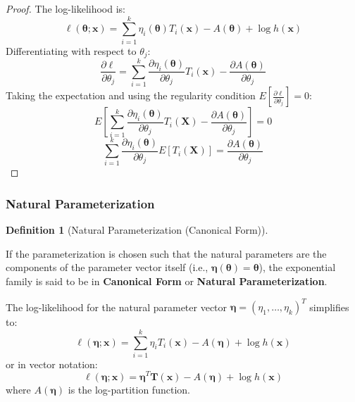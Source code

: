 \documentclass[
  letterpaper,
  DIV=11,
  numbers=noendperiod]{scrreprt}
\renewcommand{\[}{\begin{equation}}
\renewcommand{\]}{\end{equation}}
\theoremstyle{definition}
\newtheorem{definition}{Definition}[chapter]
\theoremstyle{plain}
\theoremstyle{plain}
\theoremstyle{plain}
\theoremstyle{definition}
\theoremstyle{plain}
\theoremstyle{remark}
\begin{document}
\begin{proof}
The log-likelihood is: \[
\ell(\boldsymbol{\theta}; \mathbf{x}) = \sum_{i=1}^k \eta_i(\boldsymbol{\theta}) T_i(\mathbf{x}) - A(\boldsymbol{\theta}) + \log h(\mathbf{x})
\] Differentiating with respect to \(\theta_j\): \[
\frac{\partial \ell}{\partial \theta_j} = \sum_{i=1}^k \frac{\partial \eta_i(\boldsymbol{\theta})}{\partial \theta_j} T_i(\mathbf{x}) - \frac{\partial A(\boldsymbol{\theta})}{\partial \theta_j}
\] Taking the expectation and using the regularity condition
\(E[\frac{\partial \ell}{\partial \theta_j}] = 0\): \[
E\left[ \sum_{i=1}^k \frac{\partial \eta_i(\boldsymbol{\theta})}{\partial \theta_j} T_i(\mathbf{X}) - \frac{\partial A(\boldsymbol{\theta})}{\partial \theta_j} \right] = 0
\] \[
\sum_{i=1}^k \frac{\partial \eta_i(\boldsymbol{\theta})}{\partial \theta_j} E[T_i(\mathbf{X})] = \frac{\partial A(\boldsymbol{\theta})}{\partial \theta_j}
\]
\end{proof}

\subsubsection{Natural Parameterization}\label{natural-parameterization}

\begin{definition}[Natural Parameterization (Canonical
Form)]\protect\hypertarget{def-natural-parameterization}{}\label{def-natural-parameterization}

If the parameterization is chosen such that the natural parameters are
the components of the parameter vector itself (i.e.,
\(\boldsymbol{\eta}(\boldsymbol{\theta}) = \boldsymbol{\theta}\)), the
exponential family is said to be in \textbf{Canonical Form} or
\textbf{Natural Parameterization}.

The log-likelihood for the natural parameter vector
\(\boldsymbol{\eta} = (\eta_1, \dots, \eta_k)^T\) simplifies to: \[
\ell(\boldsymbol{\eta}; \mathbf{x}) = \sum_{i=1}^k \eta_i T_i(\mathbf{x}) - A(\boldsymbol{\eta}) + \log h(\mathbf{x})
\] or in vector notation: \[
\ell(\boldsymbol{\eta}; \mathbf{x}) = \boldsymbol{\eta}^T \mathbf{T}(\mathbf{x}) - A(\boldsymbol{\eta}) + \log h(\mathbf{x})
\] where \(A(\boldsymbol{\eta})\) is the log-partition function.

\end{definition}
\end{document}
